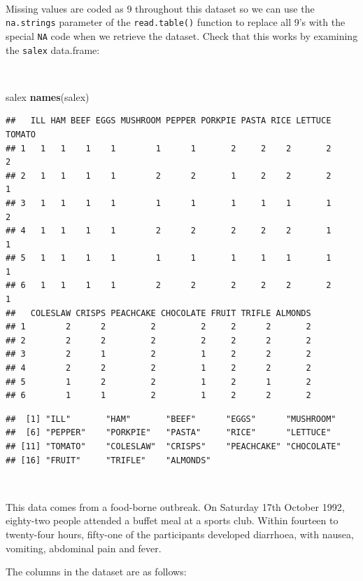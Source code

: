 \documentclass[12pt,a4paper]{book}
\newenvironment{Shaded}{\begin{snugshade}}{\end{snugshade}}
\newcommand{\KeywordTok}[1]{\textcolor[rgb]{0.13,0.29,0.53}{\textbf{#1}}}
\newcommand{\NormalTok}[1]{#1}
\theoremstyle{definition}
\theoremstyle{definition}
\theoremstyle{definition}
\theoremstyle{remark}
\begin{document}
~

Missing values are coded as 9 throughout this dataset so we can use the
\texttt{na.strings} parameter of the \texttt{read.table()} function to
replace all 9's with the special \texttt{NA} code when we retrieve the
dataset. Check that this works by examining the \texttt{salex}
data.frame:

~

\begin{Shaded}
\begin{Highlighting}[]
\NormalTok{salex}
\KeywordTok{names}\NormalTok{(salex)}
\end{Highlighting}
\end{Shaded}

\begin{verbatim}
##   ILL HAM BEEF EGGS MUSHROOM PEPPER PORKPIE PASTA RICE LETTUCE TOMATO
## 1   1   1    1    1        1      1       2     2    2       2      2
## 2   1   1    1    1        2      2       1     2    2       2      1
## 3   1   1    1    1        1      1       1     1    1       1      2
## 4   1   1    1    1        2      2       2     2    2       1      1
## 5   1   1    1    1        1      1       1     1    1       1      1
## 6   1   1    1    1        2      2       2     2    2       2      1
##   COLESLAW CRISPS PEACHCAKE CHOCOLATE FRUIT TRIFLE ALMONDS
## 1        2      2         2         2     2      2       2
## 2        2      2         2         2     2      2       2
## 3        2      1         2         1     2      2       2
## 4        2      2         2         1     2      2       2
## 5        1      2         2         1     2      1       2
## 6        1      1         2         1     2      2       2
\end{verbatim}

\begin{verbatim}
##  [1] "ILL"       "HAM"       "BEEF"      "EGGS"      "MUSHROOM" 
##  [6] "PEPPER"    "PORKPIE"   "PASTA"     "RICE"      "LETTUCE"  
## [11] "TOMATO"    "COLESLAW"  "CRISPS"    "PEACHCAKE" "CHOCOLATE"
## [16] "FRUIT"     "TRIFLE"    "ALMONDS"
\end{verbatim}

~

This data comes from a food-borne outbreak. On Saturday 17th October
1992, eighty-two people attended a buffet meal at a sports club. Within
fourteen to twenty-four hours, fifty-one of the participants developed
diarrhoea, with nausea, vomiting, abdominal pain and fever.

The columns in the dataset are as follows:
\end{document}

